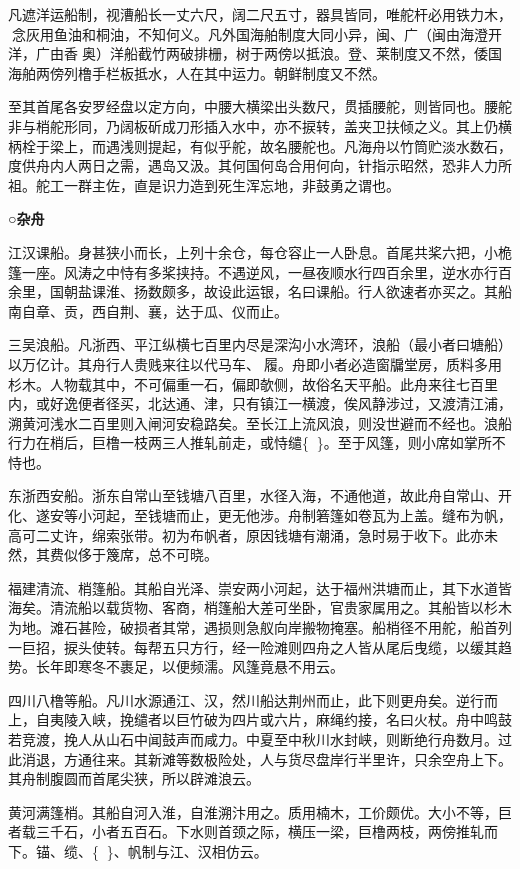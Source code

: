 \documentclass[]{article}
\begin{document}
凡遮洋运船制，视漕船长一丈六尺，阔二尺五寸，器具皆同，唯舵杆必用铁力木，念灰用鱼油和桐油，不知何义。凡外国海舶制度大同小异，闽、广（闽由海澄开洋，广由香奥）洋船截竹两破排栅，树于两傍以抵浪。登、莱制度又不然，倭国海舶两傍列橹手栏板抵水，人在其中运力。朝鲜制度又不然。

至其首尾各安罗经盘以定方向，中腰大横梁出头数尺，贯插腰舵，则皆同也。腰舵非与梢舵形同，乃阔板斫成刀形插入水中，亦不捩转，盖夹卫扶倾之义。其上仍横柄栓于梁上，而遇浅则提起，有似乎舵，故名腰舵也。凡海舟以竹筒贮淡水数石，度供舟内人两日之需，遇岛又汲。其何国何岛合用何向，针指示昭然，恐非人力所祖。舵工一群主佐，直是识力造到死生浑忘地，非鼓勇之谓也。

\textbf{○杂舟}

江汉课船。身甚狭小而长，上列十余仓，每仓容止一人卧息。首尾共桨六把，小桅篷一座。风涛之中恃有多桨挟持。不遇逆风，一昼夜顺水行四百余里，逆水亦行百余里，国朝盐课淮、扬数颇多，故设此运银，名曰课船。行人欲速者亦买之。其船南自章、贡，西自荆、襄，达于瓜、仪而止。

三吴浪船。凡浙西、平江纵横七百里内尽是深沟小水湾环，浪船（最小者曰塘船）以万亿计。其舟行人贵贱来往以代马车、履。舟即小者必造窗牖堂房，质料多用杉木。人物载其中，不可偏重一石，偏即欹侧，故俗名天平船。此舟来往七百里内，或好逸便者径买，北达通、津，只有镇江一横渡，俟风静涉过，又渡清江浦，溯黄河浅水二百里则入闸河安稳路矣。至长江上流风浪，则没世避而不经也。浪船行力在梢后，巨橹一枝两三人推轧前走，或恃缱\{\}。至于风篷，则小席如掌所不恃也。

东浙西安船。浙东自常山至钱塘八百里，水径入海，不通他道，故此舟自常山、开化、遂安等小河起，至钱塘而止，更无他涉。舟制箬篷如卷瓦为上盖。缝布为帆，高可二丈许，绵索张带。初为布帆者，原因钱塘有潮涌，急时易于收下。此亦未然，其费似侈于篾席，总不可晓。

福建清流、梢篷船。其船自光泽、崇安两小河起，达于福州洪塘而止，其下水道皆海矣。清流船以载货物、客商，梢篷船大差可坐卧，官贵家属用之。其船皆以杉木为地。滩石甚险，破损者其常，遇损则急舣向岸搬物掩塞。船梢径不用舵，船首列一巨招，捩头使转。每帮五只方行，经一险滩则四舟之人皆从尾后曳缆，以缓其趋势。长年即寒冬不裹足，以便频濡。风篷竟悬不用云。

四川八橹等船。凡川水源通江、汉，然川船达荆州而止，此下则更舟矣。逆行而上，自夷陵入峡，挽缱者以巨竹破为四片或六片，麻绳约接，名曰火杖。舟中鸣鼓若竞渡，挽人从山石中闻鼓声而咸力。中夏至中秋川水封峡，则断绝行舟数月。过此消退，方通往来。其新滩等数极险处，人与货尽盘岸行半里许，只余空舟上下。其舟制腹圆而首尾尖狭，所以辟滩浪云。

黄河满篷梢。其船自河入淮，自淮溯汴用之。质用楠木，工价颇优。大小不等，巨者载三千石，小者五百石。下水则首颈之际，横压一梁，巨橹两枝，两傍推轧而下。锚、缆、\{\}、帆制与江、汉相仿云。
\end{document}
